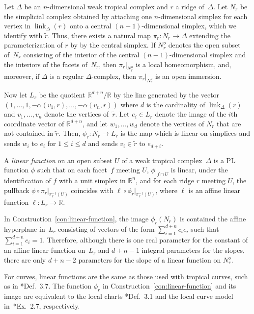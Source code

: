 \documentclass[11pt,reqno]{amsart}
\theoremstyle{definition}
\newcommand{\defi}[1]{\emph{#1}}
\newcommand{\link}{\operatorname{link}}
\newcommand{\RR}{\mathbb R}
\begin{document}
\begin{const}\label{con:linear-function}
Let $\Delta$ be an $n$-dimensional weak tropical complex and $r$ a ridge
of~$\Delta$. Let $N_r$ be the simplicial complex obtained by attaching one
$n$-dimensional simplex for each vertex in $\link_\Delta(r)$ onto a central
$(n-1)$-dimensional simplex, which we identify with $\tilde r$. Thus, there
exists a natural map $\pi_r \colon N_r \rightarrow \Delta$ extending the
parameterization of $r$ by by the central simplex. If $N_r^o$ denotes the open
subset of~$N_r$ consisting of the interior of the central $(n-1)$-dimensional
simplex and the interiors of the
facets of~$N_r$, then $\pi_r \vert_{N^o_r}$ is a local homeomorphism, and,
moreover, if $\Delta$ is a regular $\Delta$-complex, then $\pi_r \vert_{N^o_r}$
is an open immersion.

Now let $L_r$ be the quotient $\RR^{d + n} / \RR$ by the line generated by
the vector $(1, \ldots, 1, -\alpha(v_1, r), \ldots, -\alpha(v_n, r))$ where $d$
is the cardinality of $\link_\Delta(r)$ and $v_1,
\ldots, v_n$ denote the vertices of~$\tilde r$. Let $e_i \in L_r$ denote the
image of the $i$th coordinate vector of $\RR^{d+n}$, and let $w_1, \ldots, w_d$
denote the vertices of $N_r$ that are not contained in $\tilde r$. Then, $\phi_r\colon N_r
\rightarrow L_r$ is the map which is linear on simplices and sends $w_i$ to
$e_i$ for $1 \leq
i \leq d$ and sends $v_i \in \tilde r$ to $e_{d+ i}$.

A \defi{linear function} on an open subset $U$ of a weak tropical
complex~$\Delta$ is a PL function $\phi$ such that on each facet~$f$ meeting $U$,
$\phi \vert_{f \cap U}$ is linear, under the identification of $f$ with a unit
simplex in $\RR^n$, and for each ridge $r$ meeting $U$, the pullback $\phi \circ
\pi_r \vert_{\pi_r^{-1}(U)}$ coincides with $\ell \circ \phi_r
\lvert_{\pi_r^{-1}(U)}$, where
$\ell$ is an affine linear function
$\ell \colon L_r \rightarrow \RR$.
\end{const}

In Construction~\ref{con:linear-function}, the image $\phi_r(N_r)$
is contained the affine hyperplane in~$L_r$ consisting of vectors of the form
$\sum_{i=1}^{d+n} c_i e_i$ such that $\sum_{i=1}^{d+n} c_i = 1$. Therefore, although
there is one real parameter for the constant of an affine linear function
on~$L_r$  and $d+n-1$ integral parameters for the slopes, there are only $d+n-2$
parameters for the slope of a linear function on $N_r^o$.

For curves, linear functions are the same as those used with tropical curves,
such as in \cite{mikhalkin-zharkov}*{Def.~3.7}. The function $\phi_r$ in
Construction~\ref{con:linear-function} and its image are equivalent to the local
charts \cite{mikhalkin-zharkov}*{Def.~3.1} and the local curve model
in~\cite{mikhalkin-zharkov}*{Ex.~2.7}, respectively.
\end{document}
